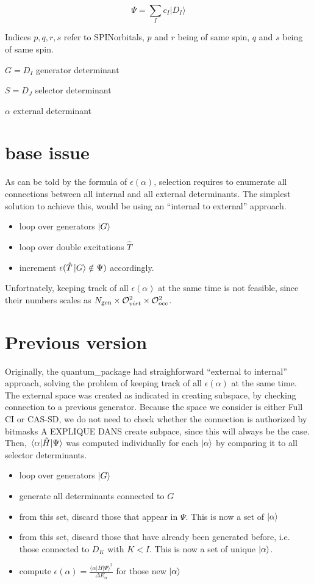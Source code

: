 \documentclass[./thesis.tex]{subfiles}
\begin{document}
\begin{equation}
\Psi = \sum_I {c_I | D_I \rangle}
\end{equation}


Indices $p,q,r,s$ refer to SPINorbitals, $p$ and $r$ being of same spin, $q$ and $s$ being of same spin. 


$G = D_I$ generator determinant

$S = D_J$ selector determinant

$\alpha$ external determinant

\section{base issue}
As can be told by the formula of $\epsilon(\alpha)$, selection requires to enumerate all connections between all internal and all external determinants.
The simplest solution to achieve this, would be using an ``internal to external'' approach.
\begin{itemize}
\item
loop over generators $\ket G$
\item
loop over double excitations $\hat T$
\item increment $\epsilon(\hat T \ket G \notin \Psi)$ accordingly.

\end{itemize}
Unfortnately, keeping track of all $\epsilon(\alpha)$ at the same time is not feasible, since their numbers scales as ${N_\text{gen}} \times \mathcal{O}_{virt}^2 \times \mathcal{O}_{occ}^2$.


\section{Previous version}

Originally, the quantum\_package had straighforward ``external to internal'' approach, solving the problem of keeping track of all $\epsilon(\alpha)$ at the same time. The external space was created as indicated in \alert{creating subspace}, by checking connection to a previous generator. Because the space we consider is either Full CI or CAS-SD, we do not need to check whether the connection is authorized by bitmasks  \alert{A EXPLIQUE DANS create subpace}, since this will always be the case. Then, $\mel{\alpha}{\hat{H}}{\Psi}$ was computed individually for each ${\ket{\alpha}}$ by comparing it to all selector determinants.

\begin{itemize}
\item
loop over generators $\ket G$
\item
generate all determinants connected to $G$
\item
from this set, discard those that appear in $\Psi$. This is now a set of $\ket \alpha$
\item
from this set, discard those that have already been generated before, i.e. those connected to $D_K$ with $K<I$. This is now a set of unique $\ket \alpha$.
\item
compute $\epsilon(\alpha) = \frac{\langle \alpha|H|\Psi\rangle^2}{\Delta E_\alpha}$ for those new $\ket \alpha$
\end{itemize}
\end{document}
